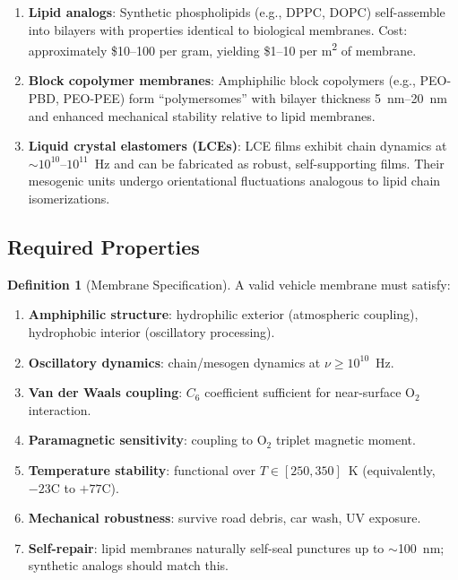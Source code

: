 \documentclass[twocolumn,10pt]{article}
\theoremstyle{definition}
\newtheorem{definition}[theorem]{Definition}
\theoremstyle{remark}
\begin{document}
\begin{enumerate}[label=(\roman*)]
  \item \textbf{Lipid analogs}: Synthetic phospholipids (e.g., DPPC, DOPC) self-assemble into bilayers with properties identical to biological membranes. Cost: approximately \$10--100 per gram, yielding \$1--10 per \si{m^2} of membrane.

  \item \textbf{Block copolymer membranes}: Amphiphilic block copolymers (e.g., PEO-PBD, PEO-PEE) form ``polymersomes'' with bilayer thickness \SI{5}{\nm}--\SI{20}{\nm} and enhanced mechanical stability relative to lipid membranes.

  \item \textbf{Liquid crystal elastomers (LCEs)}: LCE films exhibit chain dynamics at $\sim 10^{10}$--$10^{11}$~Hz and can be fabricated as robust, self-supporting films. Their mesogenic units undergo orientational fluctuations analogous to lipid chain isomerizations.
\end{enumerate}

\subsection{Required Properties}

\begin{definition}[Membrane Specification]
\label{def:membrane_spec}
A valid vehicle membrane must satisfy:
\begin{enumerate}[label=(\alph*)]
  \item \textbf{Amphiphilic structure}: hydrophilic exterior (atmospheric coupling), hydrophobic interior (oscillatory processing).
  \item \textbf{Oscillatory dynamics}: chain/mesogen dynamics at $\nu \geq 10^{10}$~Hz.
  \item \textbf{Van der Waals coupling}: $C_6$ coefficient sufficient for near-surface $\mathrm{O}_2$ interaction.
  \item \textbf{Paramagnetic sensitivity}: coupling to $\mathrm{O}_2$ triplet magnetic moment.
  \item \textbf{Temperature stability}: functional over $T \in [250, 350]$~K (equivalently, $-23$\textdegree C to $+77$\textdegree C).
  \item \textbf{Mechanical robustness}: survive road debris, car wash, UV exposure.
  \item \textbf{Self-repair}: lipid membranes naturally self-seal punctures up to $\sim$\SI{100}{nm}; synthetic analogs should match this.
\end{enumerate}
\end{definition}
\end{document}
